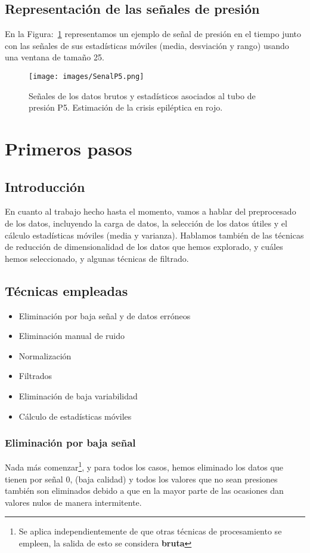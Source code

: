 \documentclass[a4paper,12pt,twoside,oldfontcommands]{memoir}
\begin{document}
	\section{Representación de las señales de presión}
	En la Figura:~\ref{fig:senalP5} representamos un ejemplo de señal de presión en el tiempo junto con las señales de sus estadísticas móviles (media, desviación y rango) usando una ventana de tamaño 25. 
	\begin{figure}
		\centering
		\texttt{[image: images/SenalP5.png]}
		\caption{Señales de los datos brutos y estadísticos asociados al tubo de presión P5. Estimación de la crisis epiléptica en rojo.}
		\label{fig:senalP5}
	\end{figure}
	
	\chapter{Primeros pasos}
	\section{Introducción}
	En cuanto al trabajo hecho hasta el momento, vamos a hablar del preprocesado de los datos, incluyendo la carga de datos, la selección de los datos útiles y el cálculo estadísticas móviles (media y varianza). Hablamos también de las técnicas de reducción de dimensionalidad de los datos que hemos explorado, y cuáles hemos seleccionado, y algunas técnicas de filtrado. 
	
	\section{Técnicas empleadas}
	\begin{itemize}
		\item Eliminación por baja señal y de datos erróneos
		\item Eliminación manual de ruido
		\item Normalización
		\item Filtrados
		\item Eliminación de baja variabilidad
		\item Cálculo de estadísticas móviles 
	\end{itemize}
	\subsection{Eliminación por baja señal}
	Nada más comenzar\footnote{Se aplica independientemente de que otras técnicas de procesamiento se empleen, la salida de esto se considera \textbf{bruta}}, y para todos los casos, hemos eliminado los datos que tienen por señal 0, (baja calidad) y todos los valores que no sean presiones también son eliminados debido a que en la mayor parte de las ocasiones dan valores nulos de manera intermitente.
	
\end{document}
